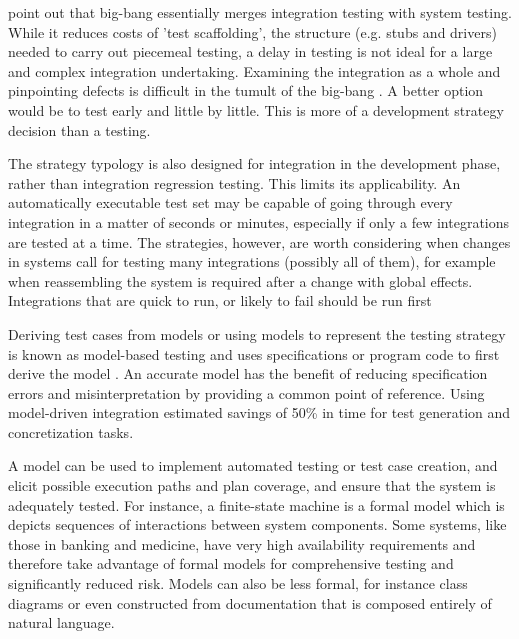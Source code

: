 \documentclass[12pt,a4paper,oneside,pdftex]{report}
\begin{document}
\citet{pezze2008software} point out that big-bang essentially merges integration testing with system testing. While it reduces costs of 'test scaffolding', the structure (e.g. stubs and drivers) needed to carry out piecemeal testing, a delay in testing is not ideal for a large and complex integration undertaking. Examining the integration as a whole and pinpointing defects is difficult in the tumult of the big-bang \citep{myers1976software, pezze2008software}. A better option would be to test early and little by little. This is more of a development strategy decision than a testing.

The strategy typology is also designed for integration in the development phase, rather than integration regression testing. This limits its applicability. An automatically executable test set may be capable of going through every integration in a matter of seconds or minutes, especially if only a few integrations are tested at a time. The strategies, however, are worth considering when changes in systems call for testing many integrations (possibly all of them), for example when reassembling the system is required after a change with global effects. Integrations that are quick to run, or likely to fail should be run first \citep{duvall2007continuous} 

Deriving test cases from models or using models to represent the testing strategy is known as model-based testing and uses specifications or program code to first derive the model \citep{pezze2008software}. An accurate model has the benefit of reducing specification errors and misinterpretation by providing a common point of reference. Using model-driven integration \citet{wieczorek2010model} estimated savings of 50\% in time for test generation and concretization tasks.

A model can be used to implement automated testing or test case creation, and elicit possible execution paths and plan coverage, and ensure that the system is adequately tested. For instance, a finite-state machine is a formal model which is depicts sequences of interactions between system components. Some systems, like those in banking and medicine, have very high availability requirements and therefore take advantage of formal models for comprehensive testing and significantly reduced risk. Models can also be less formal, for instance class diagrams or even constructed from documentation that is composed entirely of natural language. \citep{pezze2008software}
\end{document}

